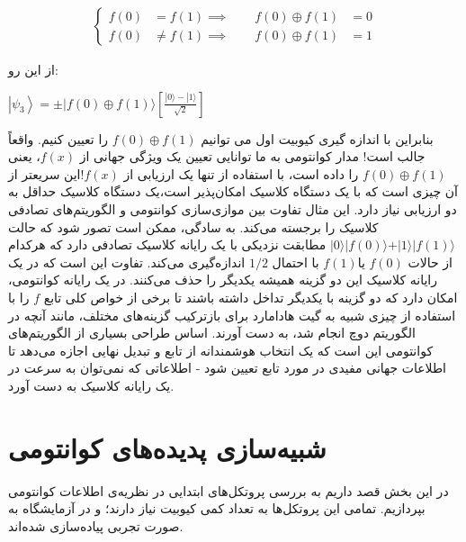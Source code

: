 \documentclass{book}
\begin{document}
$$
\begin{aligned}
	\left\{
	\begin{aligned}
		f(0) &= f(1) 
		\implies \qquad f(0) \oplus f(1) &= 0\\
		f(0) &\neq f(1) 
		\implies \qquad f(0) \oplus f(1) &= 1
	\end{aligned}
	\right.
\end{aligned}$$

از این رو:

\begin{center}
	$\left|\psi_3\right\rangle= \pm|f(0) \oplus f(1)\rangle\left[\frac{|0\rangle-|1\rangle}{\sqrt{2}}\right]$
\end{center}
بنابراین با اندازه گیری کیوبیت اول می توانیم $f(0) \oplus f(1)$ را تعیین کنیم. واقعاً جالب است! مدار کوانتومی به ما توانایی تعیین یک ویژگی جهانی از $f(x)$، یعنی$ f(0)\oplus f(1)$ را داده است، با استفاده از تنها یک ارزیابی از $f(x)$!این سریعتر از آن چیزی است که با یک دستگاه کلاسیک امکان‌پذیر است،یک دستگاه کلاسیک حداقل به دو ارزیابی نیاز دارد.
این مثال تفاوت بین موازی‌سازی کوانتومی و الگوریتم‌های تصادفی کلاسیک را برجسته می‌کند. به سادگی، ممکن است تصور شود که حالت $\vert0\rangle \vert f(0) \rangle + \vert1\rangle \vert f(1) \rangle$ مطابقت نزدیکی با یک رایانه کلاسیک تصادفی دارد که هرکدام از حالات $ f (0)$ یا$ f (1) $ با احتمال $1/2$ اندازه‌گیری می‌کند.
تفاوت این است که در یک رایانه کلاسیک این دو گزینه همیشه یکدیگر را حذف می‌کنند. در یک رایانه کوانتومی، امکان دارد که دو گزینه با یکدیگر تداخل داشته باشند تا برخی از خواص کلی تابع $f$ را با استفاده از چیزی شبیه به گیت هادامارد برای بازترکیب گزینه‌های مختلف، مانند آنچه در الگوریتم دوچ انجام شد، به دست آورند.
اساس طراحی بسیاری از الگوریتم‌های کوانتومی این است که یک انتخاب هوشمندانه از تابع و تبدیل نهایی اجازه می‌دهد تا اطلاعات جهانی مفیدی در مورد تابع تعیین شود - اطلاعاتی که نمی‌توان به سرعت در یک رایانه کلاسیک به دست آورد.



\chapter{شبیه‌سازی پدیده‌های کوانتومی}
در این بخش قصد داریم به بررسی پروتکل‌های ابتدایی در نظریه‌ی اطلاعات کوانتومی بپردازیم. تمامی این پروتکل‌ها به تعداد کمی کیوبیت نیاز دارند؛ و در آزمایشگاه به صورت تجربی پیاده‌سازی شده‌اند. 
\end{document}
